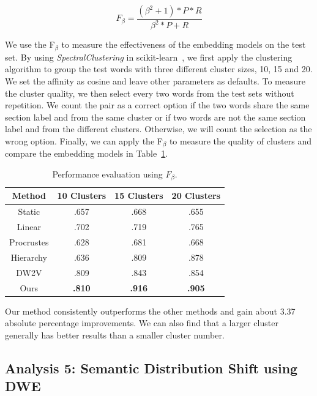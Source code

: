 $$F_\beta = \frac{(\beta^2 + 1) * P * R}{\beta^2*P + R}$$

We use the F$_\beta$ to measure the effectiveness of the embedding models on the test set.
By using \textit{SpectralClustering} in scikit-learn~\cite{pedregosa2011scikit}, we first apply the clustering algorithm to group the test words with three different cluster sizes, 10, 15 and 20. 
We set the affinity as cosine and leave other parameters as defaults.
To measure the cluster quality, we then select every two words from the test sets without repetition.
We count the pair as a correct option if the two words share the same section label and from the same cluster or if two words are not the same section label and from the different clusters.
Otherwise, we will count the selection as the wrong option.
Finally, we can apply the F$_\beta$ to measure the quality of clusters and compare the embedding models in Table~\ref{chap3:tab:dweEval}.

\begin{table}[htp]
\centering
\begin{tabular}{c||ccc}
Method & 10 Clusters & 15 Clusters & 20 Clusters \\\hline\hline
Static & .657 & .668 & .655 \\
Linear & .702 & .719 & .765 \\
Procrustes & .628 & .681 & .668 \\
Hierarchy & .636 & .809 & .878 \\
DW2V & .809 & .843 & .854 \\
Ours & \textbf{.810} & \textbf{.916} & \textbf{.905}
\end{tabular}
\caption{Performance evaluation using $F_\beta$.}
\label{chap3:tab:dweEval}
\end{table}

Our method consistently outperforms the other methods and gain about 3.37 absolute percentage improvements. We can also find that a larger cluster generally has better results than a smaller cluster number.


\subsection{Analysis 5: Semantic Distribution Shift using DWE}

